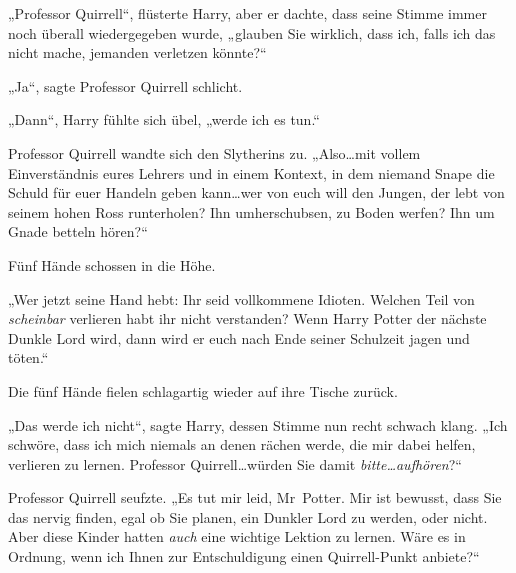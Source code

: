 „Professor Quirrell“, flüsterte Harry, aber er dachte, dass seine Stimme immer noch überall wiedergegeben wurde, „glauben Sie wirklich, dass ich, falls ich das nicht mache, jemanden verletzen könnte?“

„Ja“, sagte Professor Quirrell schlicht.

„Dann“, Harry fühlte sich übel, „werde ich es tun.“

Professor Quirrell wandte sich den Slytherins zu. „Also…mit vollem Einverständnis eures Lehrers und in einem Kontext, in dem niemand Snape die Schuld für euer Handeln geben kann…wer von euch will den Jungen, der lebt von seinem hohen Ross runterholen? Ihn umherschubsen, zu Boden werfen? Ihn um Gnade betteln hören?“

Fünf Hände schossen in die Höhe.

„Wer jetzt seine Hand hebt: Ihr seid vollkommene Idioten. Welchen Teil von \emph{scheinbar} verlieren habt ihr nicht verstanden? Wenn Harry Potter der nächste Dunkle Lord wird, dann wird er euch nach Ende seiner Schulzeit jagen und töten.“

Die fünf Hände fielen schlagartig wieder auf ihre Tische zurück.

„Das werde ich nicht“, sagte Harry, dessen Stimme nun recht schwach klang. „Ich schwöre, dass ich mich niemals an denen rächen werde, die mir dabei helfen, verlieren zu lernen. Professor Quirrell…würden Sie damit \emph{bitte…aufhören}?“

Professor Quirrell seufzte. „Es tut mir leid, Mr~Potter. Mir ist bewusst, dass Sie das nervig finden, egal ob Sie planen, ein Dunkler Lord zu werden, oder nicht. Aber diese Kinder hatten \emph{auch} eine wichtige Lektion zu lernen. Wäre es in Ordnung, wenn ich Ihnen zur Entschuldigung einen Quirrell-Punkt anbiete?“

